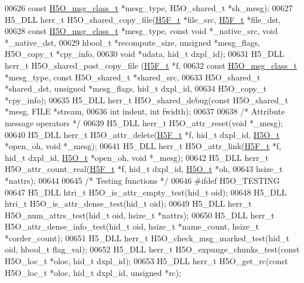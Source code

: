 \begin{DoxyCode}
00626     \textcolor{keyword}{const} \hyperlink{struct_h5_o__msg__class__t}{H5O\_msg\_class\_t} *mesg\_type, H5O\_shared\_t *sh\_mesg);
00627 H5\_DLL herr\_t H5O\_shared\_copy\_file(\hyperlink{struct_h5_f__t}{H5F\_t} *file\_src, \hyperlink{struct_h5_f__t}{H5F\_t} *file\_dst,
00628     \textcolor{keyword}{const} \hyperlink{struct_h5_o__msg__class__t}{H5O\_msg\_class\_t} *mesg\_type, \textcolor{keyword}{const} \textcolor{keywordtype}{void} *\_native\_src, \textcolor{keywordtype}{void} *\_native\_dst,
00629     hbool\_t *recompute\_size, \textcolor{keywordtype}{unsigned} *mesg\_flags, H5O\_copy\_t *cpy\_info,
00630     \textcolor{keywordtype}{void} *udata, hid\_t dxpl\_id);
00631 H5\_DLL herr\_t H5O\_shared\_post\_copy\_file (\hyperlink{struct_h5_f__t}{H5F\_t} *f,
00632     \textcolor{keyword}{const} \hyperlink{struct_h5_o__msg__class__t}{H5O\_msg\_class\_t} *mesg\_type, \textcolor{keyword}{const} H5O\_shared\_t *shared\_src,
00633     H5O\_shared\_t *shared\_dst, \textcolor{keywordtype}{unsigned} *mesg\_flags, hid\_t dxpl\_id,
00634     H5O\_copy\_t *cpy\_info);
00635 H5\_DLL herr\_t H5O\_shared\_debug(\textcolor{keyword}{const} H5O\_shared\_t *mesg, FILE *stream,
00636     \textcolor{keywordtype}{int} indent, \textcolor{keywordtype}{int} fwidth);
00637 
00638 \textcolor{comment}{/* Attribute message operators */}
00639 H5\_DLL herr\_t H5O\_attr\_reset(\textcolor{keywordtype}{void} *\_mesg);
00640 H5\_DLL herr\_t H5O\_attr\_delete(\hyperlink{struct_h5_f__t}{H5F\_t} *f, hid\_t dxpl\_id, \hyperlink{struct_h5_o__t}{H5O\_t} *open\_oh, \textcolor{keywordtype}{void} *\_mesg);
00641 H5\_DLL herr\_t H5O\_attr\_link(\hyperlink{struct_h5_f__t}{H5F\_t} *f, hid\_t dxpl\_id, \hyperlink{struct_h5_o__t}{H5O\_t} *open\_oh, \textcolor{keywordtype}{void} *\_mesg);
00642 H5\_DLL herr\_t H5O\_attr\_count\_real(\hyperlink{struct_h5_f__t}{H5F\_t} *f, hid\_t dxpl\_id, \hyperlink{struct_h5_o__t}{H5O\_t} *oh,
00643     hsize\_t *nattrs);
00644 
00645 \textcolor{comment}{/* Testing functions */}
00646 \textcolor{preprocessor}{#ifdef H5O\_TESTING}
00647 H5\_DLL htri\_t H5O\_is\_attr\_empty\_test(hid\_t oid);
00648 H5\_DLL htri\_t H5O\_is\_attr\_dense\_test(hid\_t oid);
00649 H5\_DLL herr\_t H5O\_num\_attrs\_test(hid\_t oid, hsize\_t *nattrs);
00650 H5\_DLL herr\_t H5O\_attr\_dense\_info\_test(hid\_t oid, hsize\_t *name\_count, hsize\_t *corder\_count);
00651 H5\_DLL herr\_t H5O\_check\_msg\_marked\_test(hid\_t oid, hbool\_t flag\_val);
00652 H5\_DLL herr\_t H5O\_expunge\_chunks\_test(\textcolor{keyword}{const} H5O\_loc\_t *oloc, hid\_t dxpl\_id);
00653 H5\_DLL herr\_t H5O\_get\_rc(\textcolor{keyword}{const} H5O\_loc\_t *oloc, hid\_t dxpl\_id, \textcolor{keywordtype}{unsigned} *rc);

\end{DoxyCode}
